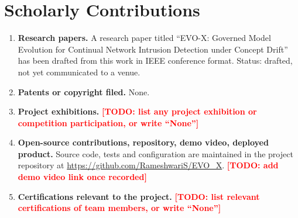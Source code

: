 \documentclass{article}
\newcommand{\todo}[1]{\textcolor{red}{\textbf{[TODO: #1]}}}
\begin{document}
\pagebreak

\section{Scholarly Contributions}
\begin{enumerate}
	\item \textbf{Research papers.} A research paper titled ``EVO-X: Governed Model Evolution for Continual Network Intrusion Detection under Concept Drift'' has been drafted from this work in IEEE conference format. Status: drafted, not yet communicated to a venue.
	\item \textbf{Patents or copyright filed.} None.
	\item \textbf{Project exhibitions.} \todo{list any project exhibition or competition participation, or write ``None''}
	\item \textbf{Open-source contributions, repository, demo video, deployed product.} Source code, tests and configuration are maintained in the project repository at \url{https://github.com/RameshwariS/EVO_X}. \todo{add demo video link once recorded}
	\item \textbf{Certifications relevant to the project.} \todo{list relevant certifications of team members, or write ``None''}
\end{enumerate}

	\pagebreak
\end{document}
